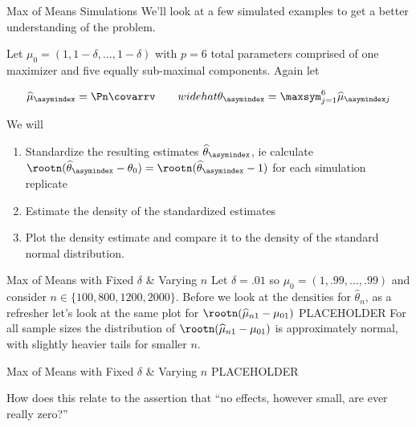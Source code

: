 \documentclass[aspectratio=169, professionalfonts]{beamer}
\begin{document}
\begin{frame}{Max of Means Simulations}
	We'll look at a few simulated examples to get a better understanding of the
	problem. \vfill

	Let $\mu_0 = (1, 1-\delta, \ldots, 1-\delta)$ with $p = 6$ total parameters comprised of
	one maximizer and five equally sub-maximal components. Again let

	\begin{displaymath}
		\widehat{\mu}_{\asymindex} = \Pn \covarrv \qquad
		widehat{\theta}_{\asymindex} = \maxsym_{j = 1}^{6} \widehat{\mu}_{\asymindex j}
	\end{displaymath}

	\vfill \pause
	We will \begin{enumerate}
		\item Standardize the resulting estimates $\widehat{\theta}_{\asymindex}$,
		      ie calculate $\rootn (\widehat{\theta}_{\asymindex} - \theta_0) = \rootn
			      (\widehat{\theta}_{\asymindex} - 1)$ for each
		      simulation replicate

		\item Estimate the density of the standardized estimates

		\item Plot the density estimate and compare it to the
		      density of the standard normal distribution.
	\end{enumerate}
\end{frame}

\begin{frame}{Max of Means with Fixed $\delta$ \& Varying $n$}
	Let $\delta = .01$ so $\mu_0 = (1, .99, \ldots, .99)$ and consider
	$n \in \{100, 800, 1200, 2000 \}$. Before we look at the densities for
	$\widehat{\theta}_n$, as a refresher let's look at the same plot for $\rootn(\widehat{\mu}_{n1}
		- \mu_{01})$
	\vfill
	PLACEHOLDER
	\vfill \pause
	For all sample sizes the distribution of $\rootn(\widehat{\mu}_{n1} - \mu_{01})$ is
	approximately normal, with slightly heavier tails for smaller $n$.

\end{frame}

\begin{frame}{Max of Means with Fixed $\delta$ \& Varying $n$}
	PLACEHOLDER

	How does this relate to the assertion that ``no effects,
	however small, are ever really zero?''


\end{frame}
\end{document}
